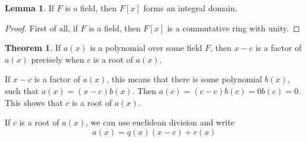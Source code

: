 \documentclass{article}
\theoremstyle{definition}
\newtheorem{theorem}{Theorem}
\theoremstyle{definition}
\newtheorem{lemma}{Lemma}
\begin{document}
\begin{lemma} 
  If $F$ is a field, then $F[x]$ forms an integral domain.
\end{lemma} 
\begin{proof}
  First of all, if $F$ is a field, then $F[x]$ is a commutative ring with unity.
\end{proof}

\begin{theorem} 
  If $a(x)$ is a polynomial over some field $F$, then $x - c$ is a factor of $a(x)$ precisely when $c$ is a root of $a(x)$.
\end{theorem}
If $x - c$ is a factor of $a(x)$, this means that there is some polynomial $b(x)$, such that $a(x) = (x - c)b(x)$. Then $a(c) = (c - c)b(c) = 0 b(c) = 0$. This shows that $c$ is a root of $a(x)$.

If $c$ is a root of $a(x)$, we can use euclidean division and write 
$$ a(x) = q(x)(x - c) + r(x) $$


% 
% 
% 
% 
% 
\end{document}
